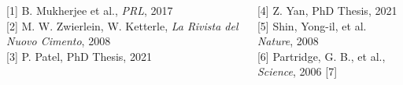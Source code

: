 \documentclass[26pt, paperwidth=36in,paperheight=48in]{tikzposter} %
\newcommand{\myfont}{\fontsize{26}{40}\selectfont}
\begin{document}
\begin{columns}
	\note[targetoffsetx=5cm, targetoffsety=-15.8cm, angle=0, radius=0cm,
	width=0.1cm, rotate=0, connection, linewidth=0cm,
	roundedcorners=0, innersep=0cm]{[4]}
	
\end{columns}


\begin{columns} 
	\block[roundedcorners=0]{\textcolor{BEC1blue}{References}}
	{
	\begin{minipage}{0.2\textwidth}
		\myfont
		{[1]} B. Mukherjee et al., \textit{PRL}, 2017\\
		{[2]} M. W. Zwierlein, W. Ketterle,  \textit{La Rivista del Nuovo Cimento}, 2008\\
		{[3]} P. Patel, PhD Thesis, 2021 
	\end{minipage}
	\hspace{0.2cm}
	\begin{minipage}{0.2\textwidth}
		\myfont
		{[4]} Z. Yan, PhD Thesis, 2021\\
		{[5]} Shin, Yong-il, et al. \textit{Nature}, 2008\\
		{[6]} Partridge, G. B., et al., \textit{Science}, 2006
		{[7]} 
	\end{minipage}


	} 
	
	
	\block[roundedcorners=0]{\textcolor{BEC1blue}{Funding}}{

}
\end{columns}
\end{document}
